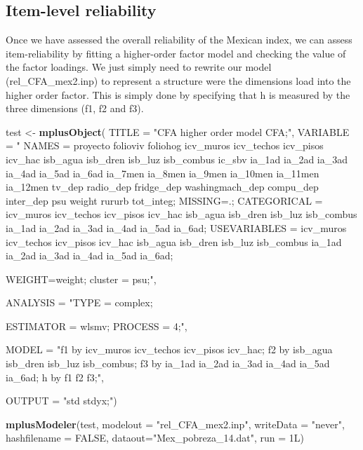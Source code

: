 \documentclass[]{book}
\newenvironment{Shaded}{\begin{snugshade}}{\end{snugshade}}
\newcommand{\DataTypeTok}[1]{\textcolor[rgb]{0.13,0.29,0.53}{#1}}
\newcommand{\KeywordTok}[1]{\textcolor[rgb]{0.13,0.29,0.53}{\textbf{#1}}}
\newcommand{\NormalTok}[1]{#1}
\newcommand{\OtherTok}[1]{\textcolor[rgb]{0.56,0.35,0.01}{#1}}
\newcommand{\StringTok}[1]{\textcolor[rgb]{0.31,0.60,0.02}{#1}}
\begin{document}
\hypertarget{item-level-reliability-1}{%
\subsection{Item-level reliability}\label{item-level-reliability-1}}

Once we have assessed the overall reliability of the Mexican index, we can assess item-reliability by fitting a higher-order factor model and checking the value of the factor loadings. We just simply need to rewrite our model (rel\_CFA\_mex2.inp) to represent a structure were the dimensions load into the higher order factor. This is simply done by specifying that h is measured by the three dimensions (f1, f2 and f3).

\begin{Shaded}
\begin{Highlighting}[]
\NormalTok{test <-}\StringTok{ }\KeywordTok{mplusObject}\NormalTok{(}
\DataTypeTok{TITLE =} \StringTok{"CFA higher order model CFA;"}\NormalTok{,}
   \DataTypeTok{VARIABLE =} \StringTok{"}
\StringTok{     NAMES = proyecto folioviv foliohog icv_muros icv_techos }
\StringTok{             icv_pisos icv_hac isb_agua isb_dren isb_luz isb_combus}
\StringTok{             ic_sbv ia_1ad ia_2ad ia_3ad ia_4ad ia_5ad ia_6ad}
\StringTok{             ia_7men ia_8men ia_9men ia_10men ia_11men ia_12men }
\StringTok{             tv_dep radio_dep fridge_dep}
\StringTok{             washingmach_dep compu_dep inter_dep psu weight}
\StringTok{            rururb tot_integ; }
\StringTok{MISSING=.;}
\StringTok{     CATEGORICAL = icv_muros icv_techos icv_pisos icv_hac isb_agua}
\StringTok{                   isb_dren isb_luz isb_combus  ia_1ad }
\StringTok{                   ia_2ad ia_3ad ia_4ad ia_5ad ia_6ad;}
\StringTok{     USEVARIABLES = icv_muros icv_techos icv_pisos icv_hac isb_agua}
\StringTok{                   isb_dren isb_luz isb_combus  ia_1ad }
\StringTok{                   ia_2ad ia_3ad ia_4ad ia_5ad ia_6ad;}

\StringTok{WEIGHT=weight;}
\StringTok{cluster = psu;"}\NormalTok{,}

   \DataTypeTok{ANALYSIS =} \StringTok{"TYPE = complex;}

\StringTok{ESTIMATOR = wlsmv;}
\StringTok{PROCESS = 4;"}\NormalTok{,}

\DataTypeTok{MODEL =} \StringTok{"f1 by icv_muros icv_techos icv_pisos icv_hac;}
\StringTok{  f2 by isb_agua}
\StringTok{        isb_dren isb_luz isb_combus;}
\StringTok{  f3 by ia_1ad ia_2ad ia_3ad ia_4ad ia_5ad ia_6ad;}
\StringTok{  h by f1 f2 f3;"}\NormalTok{,}

\DataTypeTok{OUTPUT =} \StringTok{"std stdyx;"}\NormalTok{)}

\KeywordTok{mplusModeler}\NormalTok{(test, }\DataTypeTok{modelout =} \StringTok{"rel_CFA_mex2.inp"}\NormalTok{, }
                    \DataTypeTok{writeData =} \StringTok{"never"}\NormalTok{, }\DataTypeTok{hashfilename =} \OtherTok{FALSE}\NormalTok{, }
                    \DataTypeTok{dataout=}\StringTok{"Mex_pobreza_14.dat"}\NormalTok{, }\DataTypeTok{run =}\NormalTok{ 1L)}
\end{Highlighting}
\end{Shaded}
\end{document}
